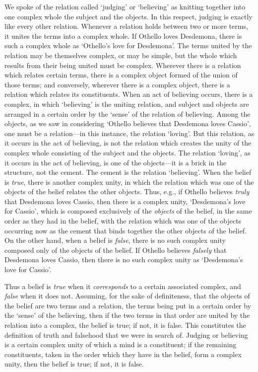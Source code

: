 \documentclass[oneside,letterpaper,12pt]{book}
\begin{document}
We spoke of the relation called
`judging' or
`believing' as knitting together into
one complex whole the subject and the objects. In this respect, judging
is exactly like every other relation. Whenever a relation holds between
two or more terms, it unites the terms into a complex whole. If Othello
loves Desdemona, there is such a complex whole as
`Othello's love for
Desdemona'. The terms united by the relation may be
themselves complex, or may be simple, but the whole which results from
their being united must be complex. Wherever there is a relation which
relates certain terms, there is a complex object formed of the union of
those terms; and conversely, wherever there is a complex object, there
is a relation which relates its constituents. When an act of believing
occurs, there is a complex, in which
`believing' is the uniting relation,
and subject and objects are arranged in a certain order by the
`sense' of the relation of believing.
Among the objects, as we saw in considering `Othello
believes that Desdemona loves Cassio', one must be a
relation---in this instance, the relation
`loving'. But this relation, as it occurs
in the act of believing, is not the relation which creates the unity of
the complex whole consisting of the subject and the objects. The
relation `loving', as it occurs in the
act of believing, is one of the objects---it is a brick in the
structure, not the cement. The cement is the relation
`believing'. When the belief is
\emph{true}, there is another complex unity, in which the relation which
was one of the objects of the belief relates the other objects. Thus,
e.g., if Othello believes \emph{truly} that Desdemona loves Cassio, then
there is a complex unity, `Desdemona's
love for Cassio', which is composed exclusively of the
\emph{objects} of the belief, in the same order as they had in the
belief, with the relation which was one of the objects occurring now as
the cement that binds together the other objects of the belief. On the
other hand, when a belief is \emph{false}, there is no such complex
unity composed only of the objects of the belief. If Othello believes
\emph{falsely} that Desdemona loves Cassio, then there is no such
complex unity as `Desdemona's love for
Cassio'.

Thus a belief is \emph{true} when it \emph{corresponds} to a certain
associated complex, and \emph{false} when it does not. \label{corresponds} Assuming, for the
sake of definiteness, that the objects of the belief are two terms and a
relation, the terms being put in a certain order by the
`sense' of the believing, then if the
two terms in that order are united by the relation into a complex, the
belief is true; if not, it is false. This constitutes the definition of
truth and falsehood that we were in search of. Judging or believing is a
certain complex unity of which a mind is a constituent; if the remaining
constituents, taken in the order which they have in the belief, form a
complex unity, then the belief is true; if not, it is false.
\end{document}
